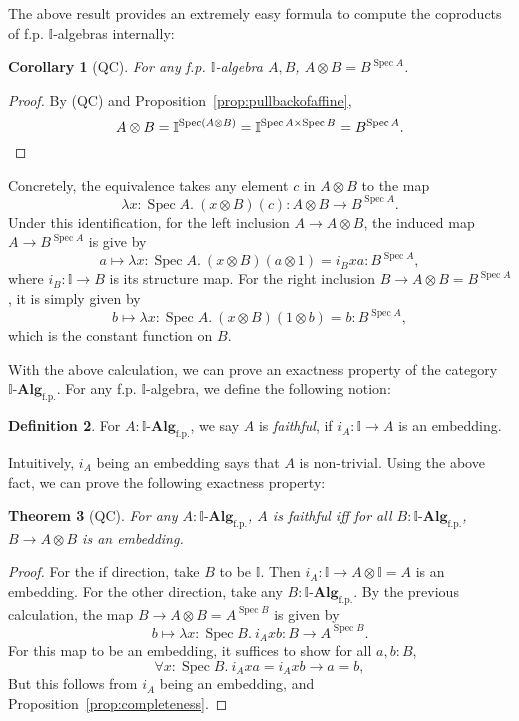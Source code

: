 \documentclass[12pt]{amsart}
\newtheorem{theorem}{Theorem}[section]
\newtheorem{corollary}[theorem]{Corollary}
\theoremstyle{definition}
\newtheorem{definition}[theorem]{Definition}
\newcommand{\mb}[1]{\mathbf{#1}}
\newcommand{\mbb}[1]{\mathbb{#1}}
\newcommand{\I}{\mbb I}
\newcommand{\mr}[1]{\mathrm{#1}}
\newcommand{\alg}{\text{-}\mb{Alg}}
\newcommand{\fp}{_{\mr{f.p.}}}
\newcommand{\fa}[2]{\forall #1\!\colon\!\!#2.\ }
\newcommand{\ld}[2]{\lambda #1\!\colon\!\!#2.\ }
\newcommand{\spec}{\operatorname{Spec}}
\begin{document}
The above result provides an extremely easy formula to compute the coproducts of f.p. $\I$-algebras internally:

\begin{corollary}[QC]\label{cor:tensorasspace}
  For any f.p. $\I$-algebra $A,B$, $A \otimes B = B^{\spec A}$.
\end{corollary}
\begin{proof}
  By (QC) and Proposition~\ref{prop:pullbackofaffine},
  \[ A \otimes B = \I^{\spec(A \otimes B)} = \I^{\spec A \times \spec B} = B^{\spec A}. \qedhere \]
\end{proof}

Concretely, the equivalence takes any element $c$ in $A \otimes B$ to the map
\[ \ld{x}{\spec A} (x\otimes B)(c) : A \otimes B \to B^{\spec A}. \]
Under this identification, for the left inclusion $A \to A \otimes B$, the induced map $A \to B^{\spec A}$ is give by
\[ a \mapsto \ld x{\spec A}(x \otimes B)(a \otimes 1) = i_Bxa : B^{\spec A}, \]
where $i_B : \I \to B$ is its structure map. For the right inclusion $B \to A \otimes B = B^{\spec A}$, it is simply given by 
\[ b \mapsto \ld x{\spec A}(x \otimes B)(1 \otimes b) = b : B^{\spec A}, \]
which is the constant function on $B$. 

With the above calculation, we can prove an exactness property of the category $\I\alg\fp$. For any f.p. $\I$-algebra, we define the following notion:

\begin{definition}
  For $A : \I\alg\fp$, we say $A$ is \emph{faithful}, if $i_A : \I \to A$ is an embedding.
\end{definition}

Intuitively, $i_A$ being an embedding says that $A$ is non-trivial. Using the above fact, we can prove the following exactness property:

\begin{theorem}[QC]\label{thm:faithfulpreserve}
  For any $A:\I\alg\fp$, $A$ is faithful iff for all $B : \I\alg\fp$, $B \to A \otimes B$ is an embedding.
\end{theorem}
\begin{proof}
  For the if direction, take $B$ to be $\I$. Then $i_A : \I \to A \otimes \I = A$ is an embedding. For the other direction, take any $B : \I\alg\fp$. By the previous calculation, the map $B \to A \otimes B = A^{\spec B}$ is given by
  \[ b \mapsto \ld{x}{\spec B} i_Axb : B \to A^{\spec B}. \]
  For this map to be an embedding, it suffices to show for all $a,b : B$,
  \[ \fa{x}{\spec B} i_Axa = i_Axb \to a = b, \]
  But this follows from $i_A$ being an embedding, and Proposition~\ref{prop:completeness}.
\end{proof}
\end{document}
